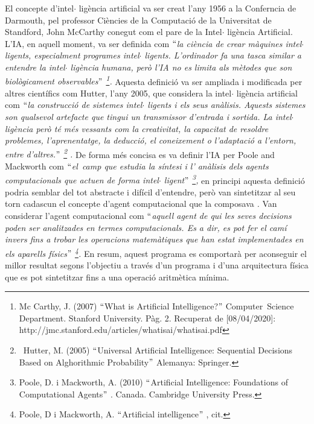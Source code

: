 \documentclass[12pt]{article}
\renewcommand{\_}{\kern-1.5pt\textunderscore\kern-1.5pt}
\begin{document}
\begin{itemize}
\vspace{\baselineskip}
\begin{justify}
El concepte d’intel$ \cdot $ ligència artificial va ser creat l’any 1956 a la Conferncia de Darmouth, pel professor Ciències de la Computació de la Universitat de Standford, John McCarthy conegut com el pare de la Intel$ \cdot $ ligència Artificial. L’IA, en aquell moment, va ser definida com $``$\textit{la ciència de crear màquines intel$ \cdot $ ligents, especialment programes intel$ \cdot $ ligents. L’ordinador fa una tasca similar a entendre la intel$ \cdot $ ligència humana, però l’IA no es limita als mètodes que son biològicament observables$"$ \footnote{ Mc Carthy, J. (2007) $``$What is Artificial Intelligence?$"$  Computer\ Science Department. Stanford University.  Pàg. 2. Recuperat de [08/04/2020]: http://jmc.stanford.edu/articles/whatisai/whatisai.pdf }. }Aquesta definició va ser ampliada i modificada per altres científics com Hutter, l’any 2005, que considera la intel$ \cdot $ ligència artificial com $``$\textit{la construcció de sistemes intel$ \cdot $ ligents i els seus anàlisis. Aquests sistemes son qualsevol artefacte que tingui un transmissor d’entrada i sortida. La intel$ \cdot $ ligència però té més vessants com la creativitat, la capacitat de resoldre problemes, l’aprenentatge, la deducció, el coneixement o l’adaptació a l’entorn, entre d’altres.$"$ \footnote{\  Hutter, M. (2005) $``$Universal Artificial Intelligence: Sequential Decisions Based on Alghorithmic Probability$"$  Alemanya: Springer. } .  }De forma més concisa es va definir l’IA per Poole and Mackworth com $``$\textit{el\ camp  que estudia la síntesi i l’ anàlisis dels agents computacionals que actuen de forma intel$ \cdot $ ligent$"$ \footnote{ Poole, D. i Mackworth, A. (2010) $``$Artificial Intelligence: Foundations of Computational Agents$"$ . Canada. Cambridge University Press.  }, }en principi aquesta definició podria semblar del tot abstracte i difícil d’entendre, però van sintetitzar al seu torn cadascun el concepte d’agent computacional que la composava \textit{. }Van considerar l’agent computacional com \textit{$``$aquell agent de qui les seves decisions poden ser analitzades en termes computacionals. Es a dir, es pot fer el camí invers fins a trobar les operacions matemàtiques que han estat implementades en els aparells físics$"$ \footnote{ Poole, D i Mackworth, A. $``$Artificial intelligence$"$ , cit. }. } En resum, aquest programa es comportarà per aconseguir el millor resultat segons l’objectiu a través d’un programa i d’una arquitectura física que es pot sintetitzar fins a una operació aritmètica mínima.
\end{justify}\par



\end{itemize}
\end{document}
